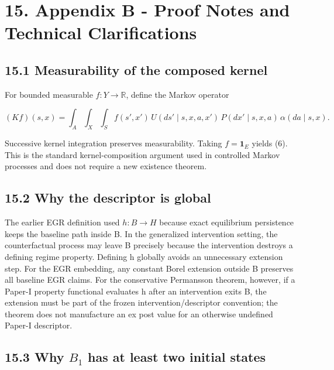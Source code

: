 \documentclass[10pt]{article}
\begin{document}
\section{15. Appendix B - Proof Notes and Technical
Clarifications}\label{appendix-b---proof-notes-and-technical-clarifications}

\subsection{15.1 Measurability of the composed
kernel}\label{measurability-of-the-composed-kernel}

For bounded measurable \(f:Y\to{}\mathbb R\), define the Markov operator

\begin{equation}
(Kf)(s,x)=\int_A\!\int_X\!\int_S f(s',x')\,U(ds'\mid s,x,a,x')\,P(dx'\mid s,x,a)\,\alpha(da\mid s,x).
\tag{22}\label{eq:22}
\end{equation}

Successive kernel integration preserves measurability. Taking
\(f=\mathbf 1_E\) yields (6). This is the standard kernel-composition
argument used in controlled Markov processes and does not require a new
existence theorem.

\subsection{15.2 Why the descriptor is
global}\label{why-the-descriptor-is-global}

The earlier EGR definition used \(h:B\to{}H\) because exact equilibrium
persistence keeps the baseline path inside B. In the generalized
intervention setting, the counterfactual process may leave B precisely
because the intervention destroys a defining regime property. Defining h
globally avoids an unnecessary extension step. For the EGR embedding,
any constant Borel extension outside B preserves all baseline EGR
claims. For the conservative Permansson theorem, however, if a Paper-I
property functional evaluates h after an intervention exits B, the
extension must be part of the frozen intervention/descriptor convention;
the theorem does not manufacture an ex post value for an otherwise
undefined Paper-I descriptor.

\subsection{\texorpdfstring{15.3 Why \(B_1\) has at least two initial
states}{15.3 Why B\_1 has at least two initial states}}\label{why-b_1-has-at-least-two-initial-states}
\end{document}
